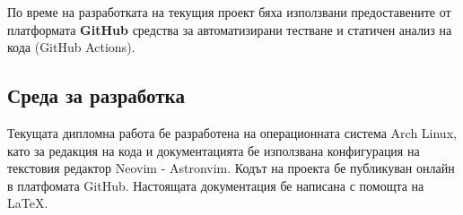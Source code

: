 
                По време на разработката на текущия проект бяха използвани 
                предоставените от платформата \textbf{GitHub} средства за 
                автоматизирани тестване и статичен анализ на кода (GitHub 
                Actions).

        \subsection{Среда за разработка}

                Текущата дипломна работа бе разработена на операционната
                система Arch Linux, като за редакция на кода и документацията 
                бе използвана конфигурация на текстовия редактор Neovim - 
                Astronvim. Кодът на проекта бе публикуван онлайн в платфомата 
                GitHub. Настоящата документация бе написана с помощта на 
                \LaTeX.

